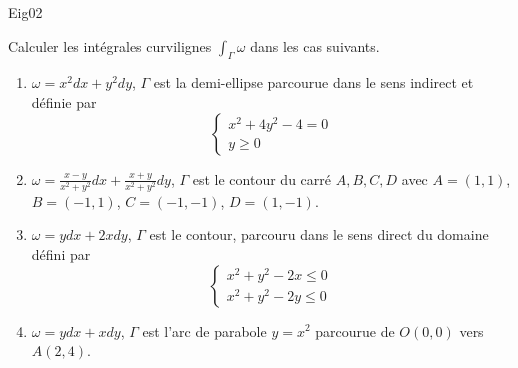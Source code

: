 \begin{tiny}Eig02\end{tiny}
Calculer les int{\'e}grales curvilignes
  $\int_{\Gamma}\omega$ dans les cas suivants.

\begin{enumerate}
  \item $\omega=x^2dx+y^2dy$, $\Gamma$ est la demi-ellipse
  parcourue dans le sens indirect et d{\'e}finie par
  \[\left \{ \begin{array}{c}
    x^2+4y^2-4=0 \\
    y \geq 0 \
  \end{array} \right.  \]
  \item $\omega=\frac{x-y}{x^2+y^2}dx+\frac{x+y}{x^2+y^2}dy$, $\Gamma$ est
  le contour du carr{\'e} $A,B,C,D$ avec $A=(1,1)$, $B=(-1,1)$,
  $C=(-1,-1)$, $D=(1,-1)$.
  \item $\omega=ydx+2xdy$, $\Gamma$ est le contour, parcouru dans
  le sens direct du domaine d{\'e}fini par
  \begin{displaymath}
\left \{ \begin{array}{c}
    x^2+y^2-2x \leq 0 \\
    x^2+y^2-2y \leq 0 \
  \end{array} \right. 
\end{displaymath}
  \item $\omega=ydx+xdy$, $\Gamma$ est l'arc de parabole $y=x^2$
  parcourue de $O(0,0)$ vers $A(2,4)$.
\end{enumerate}